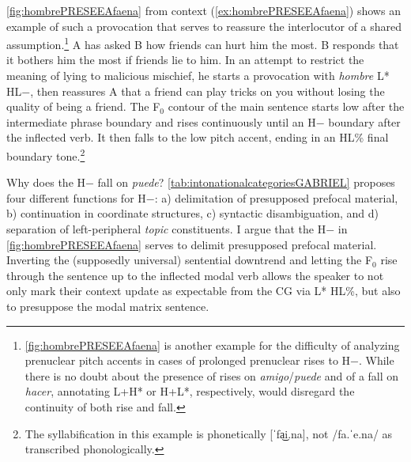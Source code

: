 \autoref{fig:hombrePRESEEAfaena} from context (\ref{ex:hombrePRESEEAfaena}) shows an example of such a provocation that serves to reassure the interlocutor of a shared assumption.\footnote{\autoref{fig:hombrePRESEEAfaena} is another example for the difficulty of analyzing prenuclear pitch accents in cases of prolonged prenuclear rises to H$-$. While there is no doubt about the presence of rises on \textit{amigo}/\textit{puede} and of a fall on \textit{hacer}, annotating L+H* or H+L*, respectively, would disregard the continuity of both rise and fall.} A has asked B how friends can hurt him the most. B responds that it bothers him the most if friends lie to him. In an attempt to restrict the meaning of lying to malicious mischief, he starts a provocation with \textit{hombre} L* HL$-$, then reassures A that a friend can play tricks on you without losing the quality of being a friend. The F$_0$ contour of the main sentence starts low after the intermediate phrase boundary and rises continuously until an H$-$ boundary after the inflected verb. It then falls to the low pitch accent, ending in an HL\% final boundary tone.\footnote{The syllabification in this example is phonetically [ˈfa͜i.na], not /fa.ˈe.na/ as transcribed phonologically.}

Why does the H$-$ fall on \textit{puede}? \autoref{tab:intonationalcategoriesGABRIEL} proposes four different functions for H$-$: a) delimitation of presupposed prefocal material, b) continuation in coordinate structures, c) syntactic disambiguation, and d) separation of left-peripheral \textit{topic} constituents. I argue that the H$-$ in \autoref{fig:hombrePRESEEAfaena} serves to delimit presupposed prefocal material. Inverting the (supposedly universal) sentential downtrend and letting the F$_0$ rise through the sentence up to the inflected modal verb allows the speaker to not only mark their context update as expectable from the \ac{CG} via L* HL\%, but also to presuppose the modal matrix sentence.

